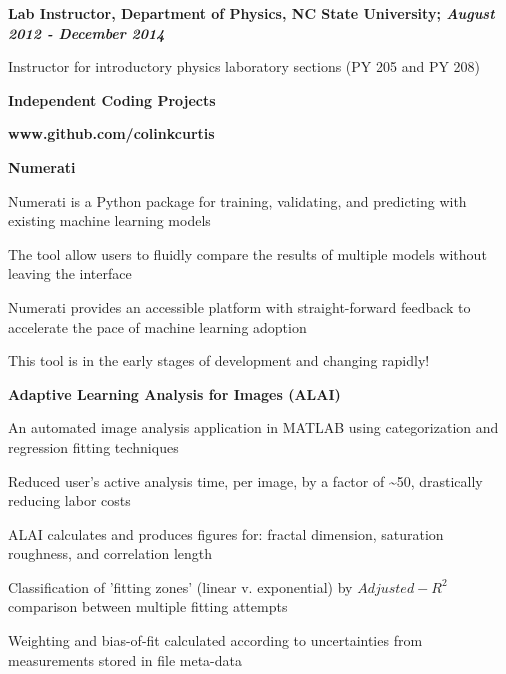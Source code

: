 \documentclass[letterpaper,final]{memoir}
\newcommand{\LargeSep}{\vspace{1.3em}}
\newcommand{\Sep}{\vspace{1.0em}}
\newcommand{\SmallSep}{\vspace{0.4em}}
\newcommand{\CVSection}[1]
	{\LARGE\textbf{#1}\par
	\SmallSep\normalsize}
\newcommand{\CVItem}[1]
	{\textbf{\color{Blue} #1}}
\begin{document}
\Sep

\CVItem{Lab Instructor, Department of Physics, NC State University; \textit{August 2012 - December 2014}}
\begin{compactitem}[\color{Blue}$\circ$]

    \SmallSep
    \item Instructor for introductory physics laboratory sections (PY 205 and PY 208)
\end{compactitem}

\LargeSep

\newpage


\notoserif \CVSection{Independent Coding Projects}
\SmallSep

\normalfont
\CVItem{www.github.com/colinkcurtis}
\LargeSep

\CVItem{Numerati}
\SmallSep
\begin{compactitem}[\color{Blue}$\circ$]

    \item Numerati is a Python package for training, validating, and predicting with existing machine learning models
    \SmallSep
    \item The tool allow users to fluidly compare the results of multiple models without leaving the interface
    \SmallSep
    \item Numerati provides an accessible platform with straight-forward feedback to accelerate the pace of machine learning adoption
    \SmallSep
    \item This tool is in the early stages of development and changing rapidly!

\end{compactitem}
\Sep

\CVItem{Adaptive Learning Analysis for Images (ALAI)}
\SmallSep
\begin{compactitem}[\color{Blue}$\circ$]
    \item An automated image analysis application in MATLAB using categorization and regression fitting techniques
    \SmallSep
    \item Reduced user's active analysis time, per image, by a factor of \textasciitilde 50, drastically reducing labor costs
    \SmallSep
    \item ALAI calculates and produces figures for: fractal dimension, saturation roughness, and correlation length
    \SmallSep
    \item Classification of 'fitting zones' (linear v. exponential) by $Adjusted-R^2$ comparison between multiple fitting attempts
    \SmallSep
    \item Weighting and bias-of-fit calculated according to uncertainties from measurements stored in file meta-data
\end{compactitem}
\LargeSep
\end{document}

